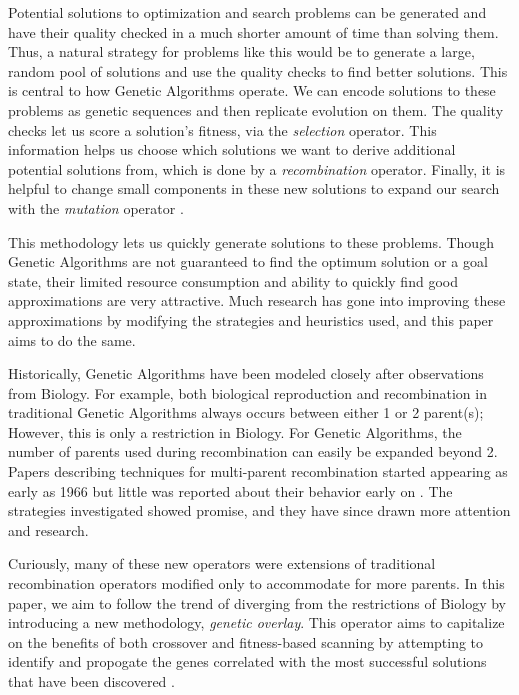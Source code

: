 Potential solutions to optimization and search problems can be generated and have their quality checked in a much shorter amount of time than solving them. Thus, a natural strategy for problems like this would be to generate a large, random pool of solutions and use the quality checks to find better solutions. This is central to how Genetic Algorithms operate. We can encode solutions to these problems as genetic sequences and then replicate evolution on them. The quality checks let us score a solution's fitness, via the \emph{selection} operator. This information helps us choose which solutions we want to derive additional potential solutions from, which is done by a \emph{recombination} operator. Finally, it is helpful to change small components in these new solutions to expand our search with the \emph{mutation} operator \cite{Deb99}.

This methodology lets us quickly generate solutions to these problems. Though Genetic Algorithms are not guaranteed to find the optimum solution or a goal state, their limited resource consumption and ability to quickly find good approximations are very attractive\cite{Russell10}. Much research has gone into improving these approximations by modifying the strategies and heuristics used, and this paper aims to do the same.

Historically, Genetic Algorithms have been modeled closely after observations from Biology. For example, both biological reproduction and recombination in traditional Genetic Algorithms always occurs between either 1 or 2 parent(s); However, this is only a restriction in Biology\cite{Eiben95}. For Genetic Algorithms, the number of parents used during recombination can easily be expanded beyond 2. Papers describing techniques for multi-parent recombination started appearing as early as 1966 but little was reported about their behavior early on \cite{Eiben03}. The strategies investigated showed promise, and they have since drawn more attention and research\cite{Eiben94}. 

Curiously, many of these new operators were extensions of traditional recombination operators modified only to accommodate for more parents. In this paper, we aim to follow the trend of diverging from the restrictions of Biology by introducing a new methodology, \emph{genetic overlay}. This operator aims to capitalize on the benefits of both crossover and fitness-based scanning by attempting to identify and propogate the genes correlated with the most successful solutions that have been discovered \cite{Russell10}. 